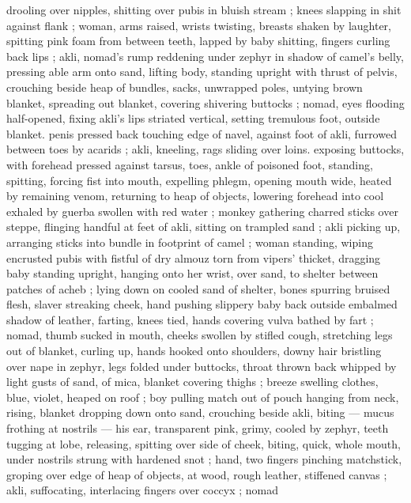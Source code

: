 drooling over nipples, shitting over pubis in bluish stream ; knees 
slapping in shit against flank ; woman, arms raised, wrists twisting, 
breasts shaken by laughter, spitting pink foam from between teeth, 
lapped by baby shitting, fingers curling back lips ; akli, nomad's 
rump reddening under zephyr in shadow of camel's belly, pressing 
able arm onto sand, lifting body, standing upright with thrust of 
pelvis, crouching beside heap of bundles, sacks, unwrapped poles, 
untying brown blanket, spreading out blanket, covering shivering 
buttocks ; nomad, eyes flooding half-opened, fixing akli's lips 
striated vertical, setting tremulous foot, outside blanket. penis 
pressed back touching edge of navel, against foot of akli, furrowed 
between toes by acarids ; akli, kneeling, rags sliding over loins. 
exposing buttocks, with forehead pressed against tarsus, toes, ankle 
of poisoned foot, standing, spitting, forcing fist into mouth, expelling 
phlegm, opening mouth wide, heated by remaining venom, returning 
to heap of objects, lowering forehead into cool exhaled by guerba 
swollen with red water ; monkey gathering charred sticks over 
steppe, flinging handful at feet of akli, sitting on trampled sand ; akli 
picking up, arranging sticks into bundle in footprint of camel ; woman 
standing, wiping encrusted pubis with fistful of dry almouz torn from 
vipers' thicket, dragging baby standing upright, hanging onto her 
wrist, over sand, to shelter between patches of acheb ; lying down on 
cooled sand of shelter, bones spurring bruised flesh, slaver 
streaking cheek, hand pushing slippery baby back outside embalmed 
shadow of leather, farting, knees tied, hands covering vulva bathed 
by fart ; nomad, thumb sucked in mouth, cheeks swollen by stifled 
cough, stretching legs out of blanket, curling up, hands hooked onto 
shoulders, downy hair bristling over nape in zephyr, legs folded 
under buttocks, throat thrown back whipped by light gusts of sand, 
of mica, blanket covering thighs ; breeze swelling clothes, blue, 
violet, heaped on roof ; boy pulling match out of pouch hanging from 
neck, rising, blanket dropping down onto sand, crouching beside akli, 
biting --- mucus frothing at nostrils --- his ear, transparent pink, 
grimy, cooled by zephyr, teeth tugging at lobe, releasing, spitting 
over side of cheek, biting, quick, whole mouth, under nostrils strung 
with hardened snot ; hand, two fingers pinching matchstick, groping 
over edge of heap of objects, at wood, rough leather, stiffened 
canvas ; akli, suffocating, interlacing fingers over coccyx ; nomad 
